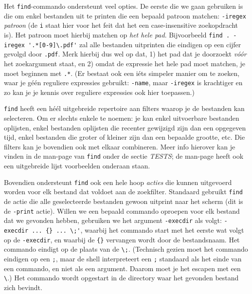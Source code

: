 \documentclass[a4paper,twoside,openany]{memoir}
\begin{document}
Het \verb!find!-commando ondersteunt veel opties. De eerste die we gaan
gebruiken is die om enkel bestanden uit te printen die een bepaald patroon
matchen: \verb!-iregex! \emph{patroon} (de \verb!i! staat hier voor het feit
dat het een case-insensitive zoekopdracht is). Het patroon moet hierbij matchen
op \emph{het hele pad}. Bijvoorbeeld \verb!find . -iregex '.*[0-9]\.pdf'! zal
alle bestanden uitprinten die eindigen op een cijfer gevolgd door \verb!.pdf!.
Merk hierbij dus wel op dat, 1) het pad dat je doorzoekt \emph{vóór} het
zoekargument staat, en 2) omdat de expressie het hele pad moet matchen, je moet
beginnen met \verb!.*!. (Er bestaat ook een iéts simpeler manier om te zoeken,
waar je géén reguliere expressies gebruikt: \verb!-name!, maar \verb!-iregex!
is krachtiger en zo kan je je kennis over reguliere expressies ook hier
toepassen.)

\verb!find! heeft een héél uitgebreide repertoire aan filters waarop je de
bestanden kan selecteren. Om er slechts enkele te noemen: je kan enkel
uitvoerbare bestanden oplijsten, enkel bestanden oplijsten die recenter
gewijzigd zijn dan een opgegeven tijd, enkel bestanden die groter of kleiner
zijn dan een bepaalde grootte, etc. Die filters kan je bovendien ook met elkaar
combineren. Meer info hierover kan je vinden in de man-page van \verb!find!
onder de sectie \emph{TESTS}; de man-page heeft ook een uitgebreide lijst
voorbeelden onderaan staan.

Bovendien ondersteunt \verb!find! ook een hele hoop \emph{acties} die kunnen
uitgevoerd worden voor elk bestand dat voldoet aan de zoekfilter. Standaard
gebruikt \verb!find! de actie die alle geselecteerde bestanden gewoon uitprint
naar het scherm (dit is de \verb!-print! actie). Willen we een bepaald commando
oproepen voor elk bestand dat we gevonden hebben, gebruiken we het argument
\verb!-execdir! als volgt: \verb!-execdir ... {} ... \;'!, waarbij het commando
start met het eerste wat volgt op de \verb!-execdir!, en waarbij de \verb!{}!
vervangen wordt door de bestandsnaam. Het commando eindigt op de plaats van de
\verb!\;!. (Technisch gezien moet het commando eindigen op een \verb!;!, maar
de shell interpreteert een \verb!;! standaard als het einde van een commando,
en niet als een argument. Daarom moet je het escapen met een \verb!\!.) Het
commando wordt opgestart in de directory waar het gevonden bestand zich
bevindt.
\end{document}
